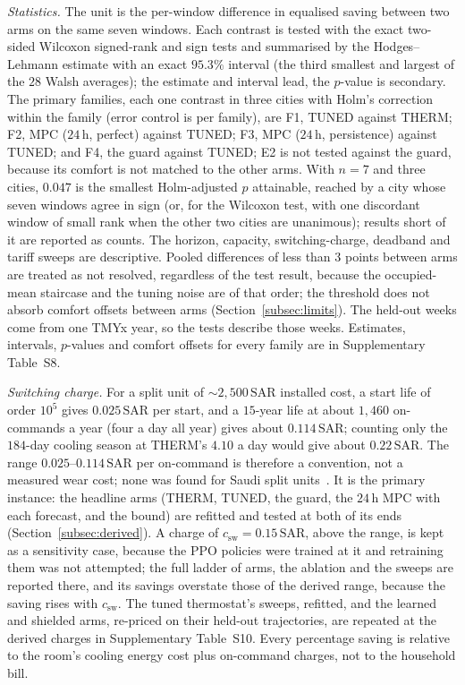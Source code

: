 \documentclass[3p,twocolumn,number]{elsarticle}
\newcommand{\csw}{c_{\mathrm{sw}}}
\newcommand{\SAR}{\text{SAR}}
\begin{document}
\emph{Statistics.} The unit is the per-window difference in equalised saving between two arms on the same seven windows. Each contrast is tested with the exact two-sided Wilcoxon signed-rank and sign tests and summarised by the Hodges--Lehmann estimate with an exact $95.3\%$ interval (the third smallest and largest of the $28$ Walsh averages); the estimate and interval lead, the $p$-value is secondary. The primary families, each one contrast in three cities with Holm's correction within the family (error control is per family), are F1, TUNED against THERM; F2, MPC ($24\,$h, perfect) against TUNED; F3, MPC ($24\,$h, persistence) against TUNED; and F4, the guard against TUNED; E2 is not tested against the guard, because its comfort is not matched to the other arms. With $n=7$ and three cities, $0.047$ is the smallest Holm-adjusted $p$ attainable, reached by a city whose seven windows agree in sign (or, for the Wilcoxon test, with one discordant window of small rank when the other two cities are unanimous); results short of it are reported as counts. The horizon, capacity, switching-charge, deadband and tariff sweeps are descriptive. Pooled differences of less than $3$ points between arms are treated as not resolved, regardless of the test result, because the occupied-mean staircase and the tuning noise are of that order; the threshold does not absorb comfort offsets between arms (Section~\ref{subsec:limits}). The held-out weeks come from one TMYx year, so the tests describe those weeks. Estimates, intervals, $p$-values and comfort offsets for every family are in Supplementary Table~S8.

\emph{Switching charge.} For a split unit of ${\sim}2{,}500\,\SAR$ installed cost, a start life of order $10^{5}$ gives $0.025\,\SAR$ per start, and a $15$-year life at about $1{,}460$ on-commands a year (four a day all year) gives about $0.114\,\SAR$; counting only the $184$-day cooling season at THERM's $4.10$ a day would give about $0.22\,\SAR$. The range $0.025$--$0.114\,\SAR$ per on-command is therefore a convention, not a measured wear cost; none was found for Saudi split units~\cite{Pang2011}. It is the primary instance: the headline arms (THERM, TUNED, the guard, the $24\,$h MPC with each forecast, and the bound) are refitted and tested at both of its ends (Section~\ref{subsec:derived}). A charge of $\csw=0.15\,\SAR$, above the range, is kept as a sensitivity case, because the PPO policies were trained at it and retraining them was not attempted; the full ladder of arms, the ablation and the sweeps are reported there, and its savings overstate those of the derived range, because the saving rises with $\csw$. The tuned thermostat's sweeps, refitted, and the learned and shielded arms, re-priced on their held-out trajectories, are repeated at the derived charges in Supplementary Table~S10. Every percentage saving is relative to the room's cooling energy cost plus on-command charges, not to the household bill.
 
\end{document}
